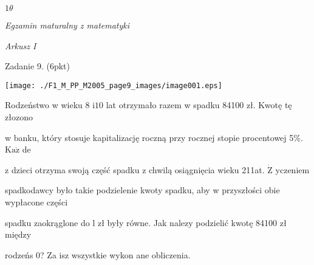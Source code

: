 \documentclass[a4paper,12pt]{article}
\begin{document}
$ 1\theta$

{\it Egzamin maturalny z matematyki}

{\it Arkusz I}

Zadanie 9. (6pkt)
\begin{center}
\texttt{[image: ./F1\_M\_PP\_M2005\_page9\_images/image001.eps]}
\end{center}
Rodzeństwo w wieku 8 $\mathrm{i} 10$ lat otrzymało razem w spadku 84100 zł. Kwotę tę złozono

w banku, który stosuje kapitalizację roczną przy rocznej stopie procentowej 5\%. $\mathrm{K}\mathrm{a}\dot{\mathrm{z}}$ de

z dzieci otrzyma swoją część spadku z chwilą osiągnięcia wieku 211at. $\dot{\mathrm{Z}}$ yczeniem

spadkodawcy było takie podzielenie kwoty spadku, aby w przyszłości obie wypłacone części

spadku zaokrąglone do l zł były równe. Jak nalez$\mathrm{y}$ podzielić kwotę 84100 zł między

rodzeńs $0$? Za isz wszystkie wykon ane obliczenia.
\end{document}
